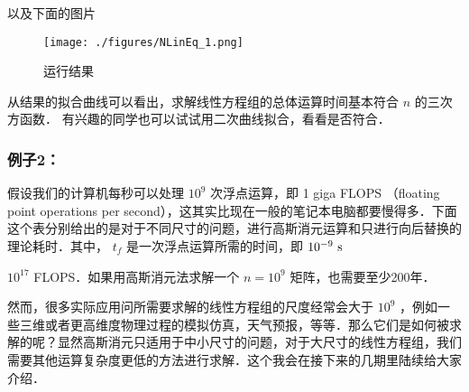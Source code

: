 以及下面的图片

\begin{figure}[ht]
\centering
\texttt{[image: ./figures/NLinEq\_1.png]}
\caption{运行结果} \label{NLinEq_fig1}
\end{figure}

从结果的拟合曲线可以看出，求解线性方程组的总体运算时间基本符合 $n$ 的三次方函数． 有兴趣的同学也可以试试用二次曲线拟合，看看是否符合．

\subsubsection{例子2：}

假设我们的计算机每秒可以处理 $10^9$ 次浮点运算，即 1 giga FLOPS （floating point operations per second），这其实比现在一般的笔记本电脑都要慢得多．下面这个表分别给出的是对于不同尺寸的问题，进行高斯消元运算和只进行向后替换的理论耗时．其中， $t_f$ 是一次浮点运算所需的时间，即 $10^{-9}~\rm{s}$ 

 $10^{17}$ FLOPS．如果用高斯消元法求解一个 $n=10^9$ 矩阵，也需要至少200年．

然而，很多实际应用问所需要求解的线性方程组的尺度经常会大于 $10^9$ ，例如一些三维或者更高维度物理过程的模拟仿真，天气预报，等等．那么它们是如何被求解的呢？显然高斯消元只适用于中小尺寸的问题，对于大尺寸的线性方程组，我们需要其他运算复杂度更低的方法进行求解．这个我会在接下来的几期里陆续给大家介绍．
